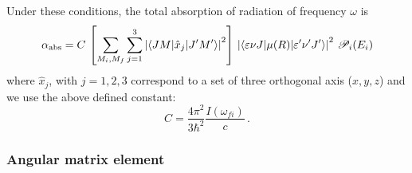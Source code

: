 Under these conditions, the total absorption of radiation of frequency $\omega$ is 
\begin{equation}\label{Q:absorption-1}
  \alpha_{\text{abs}}= C \, \left[ \sum_{M_{i}, M_{f}} \sum_{j=1}^{3} \left|\left\langle J M | \hat{x}_{j} | J' M' \right\rangle \right|^{2} \right]\, \left|\left\langle \varepsilon \nu J | \mu(R) | \varepsilon' \nu' J' \right\rangle\right|^{2} \, \mathcal{P}_{i}(E_{i})
\end{equation}
where $\hat{x}_{j}$, with $j=1,2,3$ correspond to a set of three orthogonal axis ($x,y,z$) and we use the above defined constant:
\begin{equation*}
  C = \frac{4 \pi^{2}}{3 \hbar^{2}} \frac{I(\omega_{fi})}{c} \,.
\end{equation*}

\subsubsection{Angular matrix element}
\label{S:angul-matr-elem}

